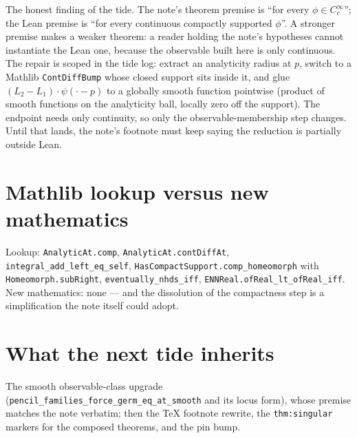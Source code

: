 \documentclass[11pt]{article}
\newcommand{\code}[1]{\texttt{#1}}
\begin{document}
The honest finding of the tide. The note's theorem premise is
``for every $\phi \in C_c^\infty$''; the Lean premise is ``for every
continuous compactly supported $\phi$''. A stronger premise makes a
weaker theorem: a reader holding the note's hypotheses cannot
instantiate the Lean one, because the observable built here is only
continuous. The repair is scoped in the tide log: extract an
analyticity radius at $p$, switch to a Mathlib \code{ContDiffBump}
whose closed support sits inside it, and glue
$(L_2 - L_1)\cdot\psi(\cdot - p)$ to a globally smooth function
pointwise (product of smooth functions on the analyticity ball,
locally zero off the support). The endpoint needs only continuity, so
only the observable-membership step changes. Until that lands, the
note's footnote must keep saying the reduction is partially outside
Lean.

\section{Mathlib lookup versus new mathematics}

\begin{sloppypar}
Lookup: \code{AnalyticAt.comp}, \code{AnalyticAt.contDiffAt},
\code{integral\_add\_left\_eq\_self},
\code{HasCompactSupport.comp\_homeomorph} with
\code{Homeomorph.subRight}, \code{eventually\_nhds\_iff},
\code{ENNReal.ofReal\_lt\_ofReal\_iff}. New mathematics: none --- and
the dissolution of the compactness step is a simplification the note
itself could adopt.
\end{sloppypar}

\section{What the next tide inherits}

The smooth observable-class upgrade
(\code{pencil\_families\_force\_germ\_eq\_at\_smooth} and its locus
form), whose premise matches the note verbatim; then the TeX
footnote rewrite, the \code{thm:singular} markers for the composed
theorems, and the pin bump.
\end{document}
